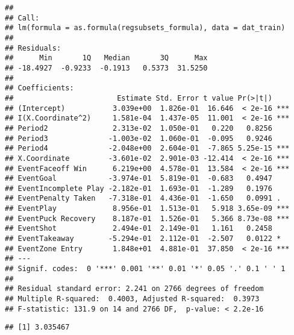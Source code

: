 \documentclass[
  a3paper,
]{article}
\newenvironment{Shaded}{\begin{snugshade}}{\end{snugshade}}
\newcommand{\AttributeTok}[1]{\textcolor[rgb]{0.13,0.29,0.53}{#1}}
\newcommand{\CommentTok}[1]{\textcolor[rgb]{0.56,0.35,0.01}{\textit{#1}}}
\newcommand{\DecValTok}[1]{\textcolor[rgb]{0.00,0.00,0.81}{#1}}
\newcommand{\FunctionTok}[1]{\textcolor[rgb]{0.13,0.29,0.53}{\textbf{#1}}}
\newcommand{\NormalTok}[1]{#1}
\newcommand{\OtherTok}[1]{\textcolor[rgb]{0.56,0.35,0.01}{#1}}
\newcommand{\SpecialCharTok}[1]{\textcolor[rgb]{0.81,0.36,0.00}{\textbf{#1}}}
\begin{document}
\begin{verbatim}
## 
## Call:
## lm(formula = as.formula(regsubsets_formula), data = dat_train)
## 
## Residuals:
##      Min       1Q   Median       3Q      Max 
## -18.4927  -0.9233  -0.1913   0.5373  31.5250 
## 
## Coefficients:
##                        Estimate Std. Error t value Pr(>|t|)    
## (Intercept)           3.039e+00  1.826e-01  16.646  < 2e-16 ***
## I(X.Coordinate^2)     1.581e-04  1.437e-05  11.001  < 2e-16 ***
## Period2               2.313e-02  1.050e-01   0.220   0.8256    
## Period3              -1.003e-02  1.060e-01  -0.095   0.9246    
## Period4              -2.048e+00  2.604e-01  -7.865 5.25e-15 ***
## X.Coordinate         -3.601e-02  2.901e-03 -12.414  < 2e-16 ***
## EventFaceoff Win      6.219e+00  4.578e-01  13.584  < 2e-16 ***
## EventGoal            -3.974e-01  5.819e-01  -0.683   0.4947    
## EventIncomplete Play -2.182e-01  1.693e-01  -1.289   0.1976    
## EventPenalty Taken   -7.318e-01  4.436e-01  -1.650   0.0991 .  
## EventPlay             8.956e-01  1.513e-01   5.918 3.65e-09 ***
## EventPuck Recovery    8.187e-01  1.526e-01   5.366 8.73e-08 ***
## EventShot             2.494e-01  2.149e-01   1.161   0.2458    
## EventTakeaway        -5.294e-01  2.112e-01  -2.507   0.0122 *  
## EventZone Entry       1.848e+01  4.881e-01  37.850  < 2e-16 ***
## ---
## Signif. codes:  0 '***' 0.001 '**' 0.01 '*' 0.05 '.' 0.1 ' ' 1
## 
## Residual standard error: 2.241 on 2766 degrees of freedom
## Multiple R-squared:  0.4003, Adjusted R-squared:  0.3973 
## F-statistic: 131.9 on 14 and 2766 DF,  p-value: < 2.2e-16
\end{verbatim}

\begin{Shaded}
\end{Shaded}

\begin{verbatim}
## [1] 3.035467
\end{verbatim}
\end{document}
